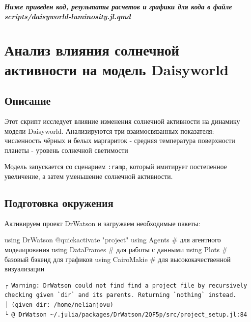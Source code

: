 \documentclass[
  12pt,
  a4paper,
  DIV=11,
  numbers=noendperiod]{scrreprt}
\newenvironment{Shaded}{\begin{snugshade}}{\end{snugshade}}
\newcommand{\BuiltInTok}[1]{\textcolor[rgb]{0.00,0.23,0.31}{#1}}
\newcommand{\CommentTok}[1]{\textcolor[rgb]{0.37,0.37,0.37}{#1}}
\newcommand{\ImportTok}[1]{\textcolor[rgb]{0.00,0.46,0.62}{#1}}
\newcommand{\PreprocessorTok}[1]{\textcolor[rgb]{0.68,0.00,0.00}{#1}}
\newcommand{\StringTok}[1]{\textcolor[rgb]{0.13,0.47,0.30}{#1}}
\begin{document}
\textbf{\emph{Ниже приведен код, результаты расчетов и графики для кода
в файле scripts/daisyworld-luminosity.jl.qmd}}

\chapter{Анализ влияния солнечной активности на модель
Daisyworld}\label{ux430ux43dux430ux43bux438ux437-ux432ux43bux438ux44fux43dux438ux44f-ux441ux43eux43bux43dux435ux447ux43dux43eux439-ux430ux43aux442ux438ux432ux43dux43eux441ux442ux438-ux43dux430-ux43cux43eux434ux435ux43bux44c-daisyworld}

\section{Описание}\label{ux43eux43fux438ux441ux430ux43dux438ux435-2}

Этот скрипт исследует влияние изменения солнечной активности на динамику
модели Daisyworld. Анализируются три взаимосвязанных показателя: -
численность чёрных и белых маргариток - средняя температура поверхности
планеты - уровень солнечной светимости

Модель запускается со сценарием \texttt{:ramp}, который имитирует
постепенное увеличение, а затем уменьшение солнечной активности.

\section{Подготовка
окружения}\label{ux43fux43eux434ux433ux43eux442ux43eux432ux43aux430-ux43eux43aux440ux443ux436ux435ux43dux438ux44f-2}

Активируем проект DrWatson и загружаем необходимые пакеты:

\begin{Shaded}
\begin{Highlighting}[]
\ImportTok{using} \BuiltInTok{DrWatson}
\PreprocessorTok{@quickactivate} \StringTok{"project"}
\ImportTok{using} \BuiltInTok{Agents}      \CommentTok{\# для агентного моделирования}
\ImportTok{using} \BuiltInTok{DataFrames}  \CommentTok{\# для работы с данными}
\ImportTok{using} \BuiltInTok{Plots}       \CommentTok{\# базовый бэкенд для графиков}
\ImportTok{using} \BuiltInTok{CairoMakie}  \CommentTok{\# для высококачественной визуализации}
\end{Highlighting}
\end{Shaded}

\begin{verbatim}
┌ Warning: DrWatson could not find find a project file by recursively checking given `dir` and its parents. Returning `nothing` instead.
│ (given dir: /home/nelianjovu)
└ @ DrWatson ~/.julia/packages/DrWatson/2QF5p/src/project_setup.jl:84
\end{verbatim}
\end{document}
